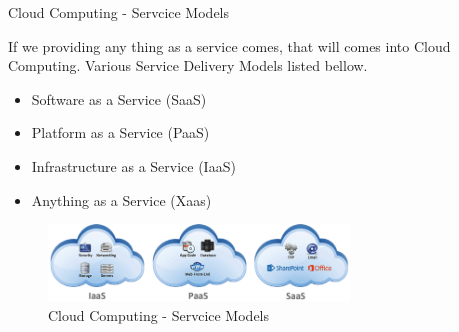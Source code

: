 \documentclass[xcolor=dvipsnames]{beamer}
\begin{document}
\begin{frame}{Cloud Computing - Servcice Models }

If we providing any thing as a service comes, that will comes into Cloud Computing. Various Service Delivery Models listed bellow.

\begin{itemize}
\item Software as a Service (SaaS) 
\item Platform as a Service (PaaS)
\item Infrastructure as a Service (IaaS)
\item Anything as a Service (Xaas)
\end{itemize}
\begin{figure}[H]
 \centering
 \includegraphics[width=8cm]{./service.png}
 \caption{Cloud Computing - Servcice Models \label{fig:Cloud Computing - Servcice Models} }
\end{figure}

\end{frame}
\end{document}
